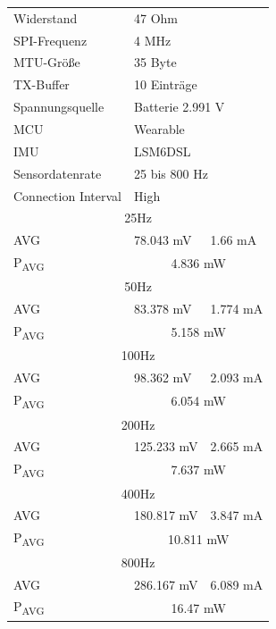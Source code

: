 \begin{figure}[!hbtp]
  \begin{minipage}{0.5\textwidth}
    \centering
    \begin{tabular}{|l|l|l|}
      \hline
      Widerstand & \multicolumn{2}{l|}{47 Ohm}\\
      SPI-Frequenz & \multicolumn{2}{l|}{4 MHz}\\
      MTU-Größe & \multicolumn{2}{l|}{35 Byte}\\
      TX-Buffer & \multicolumn{2}{l|}{10 Einträge}\\
      Spannungsquelle & \multicolumn{2}{l|}{Batterie 2.991 V}\\
      MCU & \multicolumn{2}{l|}{Wearable}\\
      IMU & \multicolumn{2}{l|}{LSM6DSL}\\
      Sensordatenrate & \multicolumn{2}{l|}{25 bis 800 Hz}\\
      Connection Interval & \multicolumn{2}{l|}{High}\\
      \hline
      \multicolumn{3}{|c|}{25Hz}\\
      AVG & 78.043 mV & 1.66 mA\\
      P\textsubscript{AVG} & \multicolumn{2}{c|}{4.836 mW}\\
      \hline
      \multicolumn{3}{|c|}{50Hz}\\
      AVG & 83.378 mV & 1.774 mA\\
      P\textsubscript{AVG} & \multicolumn{2}{c|}{5.158 mW}\\
      \hline
      \multicolumn{3}{|c|}{100Hz}\\
      AVG & 98.362 mV & 2.093 mA\\
      P\textsubscript{AVG} & \multicolumn{2}{c|}{6.054 mW}\\
      \hline
      \multicolumn{3}{|c|}{200Hz}\\
      AVG & 125.233 mV & 2.665 mA\\
      P\textsubscript{AVG} & \multicolumn{2}{c|}{7.637 mW}\\
      \hline
      \multicolumn{3}{|c|}{400Hz}\\
      AVG & 180.817 mV & 3.847 mA\\
      P\textsubscript{AVG} & \multicolumn{2}{c|}{10.811 mW}\\
      \hline
      \multicolumn{3}{|c|}{800Hz}\\
      AVG & 286.167 mV & 6.089 mA\\
      P\textsubscript{AVG} & \multicolumn{2}{c|}{16.47 mW}\\

\end{tabular}
\end{minipage}
\end{figure}
